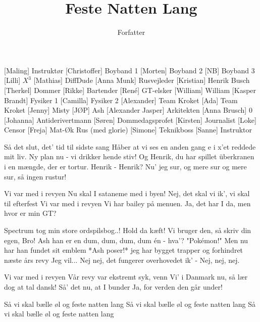 \documentclass[a4paper,11pt]{article}
\title{Feste Natten Lang}
\author{Forfatter}
\begin{document}
\maketitle

\begin{roles}
[Maling] Instruktør
[Christoffer] Boyband 1
[Morten] Boyband 2
[NB] Boyband 3
[Lilli] $X^3$
[Mathias] DiffDude
[Anna Munk] Rusvejleder
[Kristian] Henrik Busch
[Therkel] Dommer
[Rikke] Bartender
[René] GT-elsker
[William] William
[Kasper Brandt] Fysiker 1
[Camilla] Fysiker 2
[Alexander] Team Kroket
[Ada] Team Kroket
[Jenny] Misty
[JØP] Ash
[Alexander Jasper] Arkitekten
[Anna Brusch] 0
[Johanna] Antiderivertmann
[Søren] Dommedagsprofet
[Kirsten] Journalist
[Loke] Censor
[Freja] Mat-Øk Rus (med glorie)
[Simone] Teknikboss
[Sanne] Instruktor
\end{roles}

\begin{song}
 Så det slut, det' tid til sidste sang
 Håber at vi ses en anden gang
 e i x'et reddede mit liv.
 Ny plan nu - vi drikker hende stiv!
 Og Henrik, du har spillet überkranen i en mængde, der er tortur. Henrik - Henrik?
 Nu' jeg sur, og mere sur og mere sur, så ingen rustur!

 Vi var med i revyen
 Nu skal I sataneme med i byen!
 Nej, det skal vi ik', vi skal til efterfest
 Vi var med i revyen
 Vi har bailey på menuen.
 Ja, det har I da, men hvor er min GT?

 Spectrum tog min store ordspilsbog..!
 Hold da kæft! Vi bruger den, så skriv din egen, Bro!
 Ash han er en dum, dum, dum, dum én - hva'? "Pokémon!"
 Men nu har han fundet sit emblem *Ash poser!*
 jeg har bygget trapper og forhindret næste års revy
 Jeg vil... Nej nej, det fungerer overhovedet ik' - Nej, nej, nej.

 Vi var med i revyen
 Vår revy var ekstremt syk, venn
 Vi' i Danmark nu, så lær dog at tal dansk!
 Så' det nu, at I bunder
 Ja, for verden den går under!

 Så vi skal bælle øl og feste natten lang
 Så vi skal bælle øl og feste natten lang
 Så vi skal bælle øl og feste natten lang
\end{song}
\end{document}
